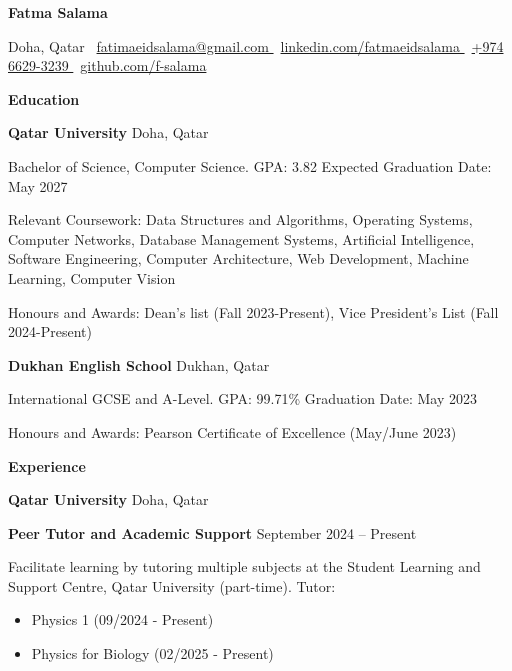 \documentclass[10pt]{article}
\begin{document}
\begin{center}
    \fontsize{14}{16}\textbf{Fatma Salama} \\ 
    \hrulefill
\end{center}

\begin{center}
    Doha, Qatar 
    \textbullet \ \href{mailto:fatimaeidsalama@gmail.com}{fatimaeidsalama@gmail.com } 
    \textbullet \ \href{https://www.linkedin.com/in/fatmaeidsalama/}{linkedin.com/fatmaeidsalama } 
    \textbullet \ \href{tel:+97466293239}{+974 6629-3239 }
    \ \href{https://github.com/f-salama}{github.com/f-salama }
\end{center}

\begin{center}
    \fontsize{11}{13}\textbf{Education}
\end{center}
\textbf{Qatar University} \hfill Doha, Qatar

Bachelor of Science, Computer Science. GPA: 3.82 \hfill Expected Graduation Date: May 2027

Relevant Coursework: Data Structures and Algorithms, Operating Systems, Computer Networks, Database Management Systems, 
Artificial Intelligence, Software Engineering, Computer Architecture, Web Development, Machine Learning, Computer Vision

Honours and Awards: Dean's list (Fall 2023-Present), Vice President's List (Fall 2024-Present)

\vspace{8pt}

\textbf{Dukhan English School} \hfill	Dukhan, Qatar

International GCSE and A-Level. GPA: 99.71\% \hfill Graduation Date: May 2023

Honours and Awards: Pearson Certificate of Excellence (May/June 2023)

\begin{center}
    \fontsize{11}{13}\textbf{Experience}
\end{center}
\textbf{Qatar University} \hfill Doha, Qatar

\textbf{Peer Tutor and Academic Support} \hfill September 2024 – Present

Facilitate learning by tutoring multiple subjects at the Student Learning and Support Centre, Qatar University (part-time). Tutor:
\begin{itemize}[noitemsep, topsep=0pt, partopsep=0pt, parsep=0pt]
    \item Physics 1 (09/2024 - Present)
    \item Physics for Biology (02/2025 - Present)
\end{itemize}
\end{document}
